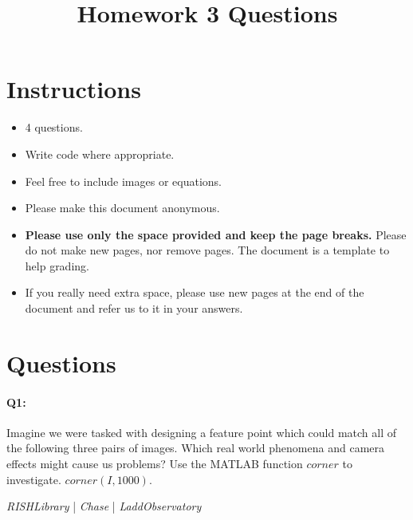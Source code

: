 \title{\vspace{-1cm}Homework 3 Questions}



\maketitle
\vspace{-3cm}
\thispagestyle{fancy}

\section*{Instructions}
\begin{itemize}
  \item 4 questions.
  \item Write code where appropriate.
  \item Feel free to include images or equations.
  \item Please make this document anonymous.
  \item \textbf{Please use only the space provided and keep the page breaks.} Please do not make new pages, nor remove pages. The document is a template to help grading.
  \item If you really need extra space, please use new pages at the end of the document and refer us to it in your answers.
\end{itemize}

\section*{Questions}

\paragraph{Q1:} Imagine we were tasked with designing a feature point which could match all of the following three pairs of images. Which real world phenomena and camera effects might cause us problems?
Use the MATLAB function \href{https://www.mathworks.com/help/images/ref/corner.html}{$corner$} to investigate. $corner(I,1000)$.

\emph{RISHLibrary} | \emph{Chase} | \emph{LaddObservatory}

